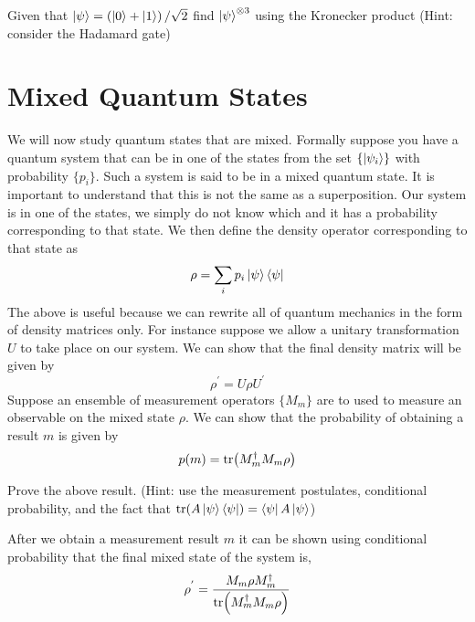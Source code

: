 \begin{exercise}
Given that $\ket{\psi} = \left(\ket{0} + \ket{1} \right)/\sqrt{2}$ find $\ket{\psi}^{\otimes 3}$ using the Kronecker product (Hint: consider the Hadamard gate)
\end{exercise}

\section{Mixed Quantum States}

We will now study quantum states that are mixed. Formally suppose you have a quantum system that can be in one of the states from the set $\{\ket{\psi_i}\}$ with probability $\{p_i\}$. Such a system is said to be in a mixed quantum state. It is important to understand that this is not the same as a superposition. Our system is in one of the states, we simply do not know which and it has a probability corresponding to that state.
We then define the density operator corresponding to that state as 
$$\rho = \sum_i p_i \ket{\psi}\bra{\psi} $$
The above is useful because we can rewrite all of quantum mechanics in the form of density matrices only. For instance suppose we allow a unitary transformation $U$ to take place on our system. We can show that the final density matrix will be given by 
$$ \rho^{'} = U\rho U^{'}$$
Suppose an ensemble of measurement operators $\{ M_m \}$ are to used to measure an observable on the mixed state $\rho$. We can show that the probability of obtaining a result $m$ is given by 
$$ p(m) = \tr(M_m^{\dagger}M_m \rho)$$
\begin{exercise}
Prove the above result. (Hint: use the measurement postulates, conditional probability, and the fact that $\tr(A\ket{\psi}\bra{\psi}) = \bra{\psi}A\ket{\psi}$)
\end{exercise}

After we obtain a measurement result $m$ it can be shown using conditional probability that the final mixed state of the system is,
$$ \rho^{'} = \frac{M_m \rho M_m^{\dagger}}{\tr(M_m^{\dagger}M_m \rho)}$$


